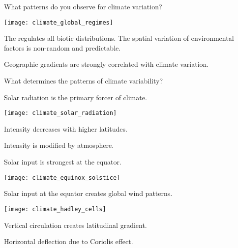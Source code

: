 \documentclass[t]{beamer}
\begin{document}
\begin{frame}[t,plain]{What patterns do you observe for climate variation?}

	\begin{center}
		\texttt{[image: climate\_global\_regimes]}
	\end{center}
	
\end{frame}


\begin{frame}[t,plain]{The  regulates all biotic distributions.}
	\hangpara The spatial variation of environmental factors is non-random and predictable.
	
	\hangpara Geographic gradients are strongly correlated with climate variation.
	
	\hangpara What determines the patterns of climate variability?
\end{frame}


\begin{frame}[t,plain]{Solar radiation is the primary forcer of climate.}
	\begin{minipage}{0.6\textwidth}%
		\texttt{[image: climate\_solar\_radiation]}
	\end{minipage}
	\begin{minipage}{0.35\textwidth}%
		\vspace{-4\baselineskip}
		\hangpara Intensity decreases with higher latitudes.
		
		\hangpara Intensity is modified by atmosphere.

	\end{minipage}
\end{frame}


\begin{frame}[t,plain]{Solar input is strongest at the equator.}
	
	\begin{center}
		\texttt{[image: climate\_equinox\_solstice]}
	\end{center}
		
\end{frame}

\begin{frame}[t,plain]{Solar input at the equator creates global wind patterns.}
	\begin{minipage}{0.55\textwidth}%
		\texttt{[image: climate\_hadley\_cells]}
	\end{minipage}
	\begin{minipage}{0.40\textwidth}%
		\vspace{-4\baselineskip}
		\hangpara Vertical circulation creates latitudinal gradient.
		
		\hangpara Horizontal deflection due to Coriolis effect.

	\end{minipage}
\end{frame}
\end{document}
